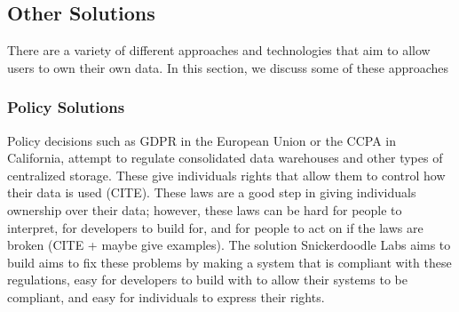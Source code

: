 
\subsection{Other Solutions}
There are a variety of different approaches and technologies that aim to allow users to own their own data. In this section, we discuss some of these approaches
\subsubsection{Policy Solutions}
Policy decisions such as GDPR in the European Union or the CCPA in California, attempt to regulate consolidated data warehouses and other types of centralized storage. These give individuals rights that allow them to control how their data is used (CITE). These laws are a good step in giving individuals ownership over their data; however, these laws can be hard for people to interpret, for developers to build for, and for people to act on if the laws are broken (CITE + maybe give examples). The solution Snickerdoodle Labs aims to build aims to fix these problems by making a system that is compliant with these regulations, easy for developers to build with to allow their systems to be compliant, and easy for individuals to express their rights.


